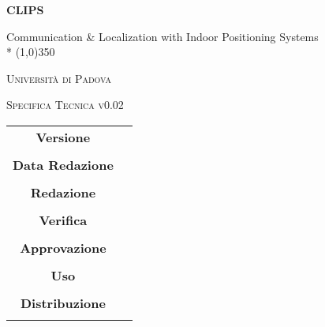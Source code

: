 \documentclass[a4paper,12pt]{article}
\author{Nome Autore}
\date{05/01/2016}
\begin{document}
\begin{titlepage}
	\centering
	{\huge\bfseries CLIPS\par}
	Communication \& Localization with Indoor Positioning Systems \\*
	\line(1,0){350} \\
	{\scshape\LARGE Università di Padova \par}
	\vspace{1cm}
	{\scshape\Large Specifica Tecnica v0.02 \par}
	\logo
	\newpage
		\begin{tabular}{c|c}
			{\hfill \textbf{Versione}} 			& 					\\ \\
			{\hfill\textbf{Data Redazione}} 	&            		\\ \\
			{\hfill\textbf{Redazione}} 			&  					\\ \\
			{\hfill\textbf{Verifica}} 			&  					\\ \\
			{\hfill\textbf{Approvazione}} 		&  					\\ \\
			{\hfill\textbf{Uso}} 				& 					\\ \\
			{\hfill\textbf{Distribuzione}} 		& 					\\ \\
		\end{tabular}
	\end{titlepage}
	
	\newpage
	\pagestyle{myfront}
	
	\newpage
		\tableofcontents
	\newpage
		\listoffigures	
	\label{LastFrontPage}
	\newpage
	
	\pagestyle{mymain}
	
	 \newpage
		

	\newpage
		
	
	\newpage
		
	
	\newpage
		

	
	\newpage
		

	\newpage
		
	
	\newpage
		
	
	\newpage
		

		
	\label{LastPage}
\end{document}
